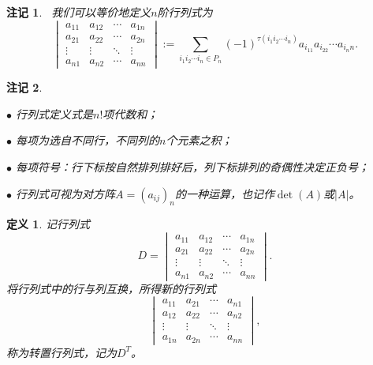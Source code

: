 \documentclass[a4paper]{book}
\newtheorem{Def}{定义}[chapter]
\newtheorem{rmk}{注记}[chapter]
\newcommand{\enum}{\begin{list}{}{\setlength{\leftmargin}{0pt} \setlength{\itemindent}{2.5em} \setlength{\listparindent}{2em}}}
\begin{document}
\begin{rmk}\
我们可以等价地定义$n$阶行列式为
$$\begin{vmatrix}
a_{11} & a_{12} & \cdots & a_{1n} \\ a_{21} & a_{22} & \cdots & a_{2n} \\ \vdots & \vdots & \ddots & \vdots \\ a_{n1} & a_{n2} & \cdots & a_{nn}
\end{vmatrix} := \sum\limits_{i_1i_2\cdots i_n \in P_n} (-1)^{\tau(i_1i_2\cdots i_n)} a_{i_11}a_{i_22}\cdots a_{i_nn}.$$
\end{rmk}

\begin{rmk}\

\enum
\item[$\bullet$] 行列式定义式是$n!$项代数和；
\item[$\bullet$] 每项为选自不同行，不同列的$n$个元素之积；
\item[$\bullet$] 每项符号：行下标按自然排列排好后，列下标排列的奇偶性决定正负号；
\item[$\bullet$] 行列式可视为对方阵$A=(a_{ij})_{n}$的一种运算，也记作$\det(A)$或$|A|$。
\end{list}
\end{rmk}

\begin{Def}
记行列式
$$D = \begin{vmatrix}
a_{11} & a_{12} & \cdots & a_{1n} \\ a_{21} & a_{22} & \cdots & a_{2n} \\ \vdots & \vdots & \ddots & \vdots \\ a_{n1} & a_{n2} & \cdots & a_{nn}
\end{vmatrix}.$$
将行列式中的行与列互换，所得新的行列式
$$\begin{vmatrix}
a_{11} & a_{21} & \cdots & a_{n1} \\ a_{12} & a_{22} & \cdots & a_{n2} \\ \vdots & \vdots & \ddots & \vdots \\ a_{1n} & a_{2n} & \cdots & a_{nn}
\end{vmatrix},$$
称为转置行列式，记为$D^T$。
\end{Def}
\end{document}
